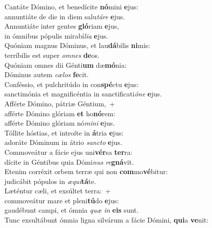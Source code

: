 \evenverse Cantáte Dómino, et benedícite \textbf{nó}mini \textbf{e}jus:~\*\\
\evenverse annuntiáte de die in diem salu\textit{tá}\textit{re} \textbf{e}jus.\\
\oddverse Annuntiáte inter gentes \textbf{gló}riam \textbf{e}jus,~\*\\
\oddverse in ómnibus pópulis mirabí\textit{li}\textit{a} \textbf{e}jus.\\
\evenverse Quóniam magnus Dóminus, et lau\textbf{dá}bilis \textbf{ni}mis:~\*\\
\evenverse terríbilis est super \textit{om}\textit{nes} \textbf{de}os.\\
\oddverse Quóniam omnes dii Génti\textbf{um} dæ\textbf{mó}nia:~\*\\
\oddverse Dóminus autem \textit{cæ}\textit{los} \textbf{fe}cit.\\
\evenverse Conféssio, et pulchritúdo in con\textbf{spé}ctu \textbf{e}jus:~\*\\
\evenverse sanctimónia et magnificéntia in sanctificati\textit{ó}\textit{ne} \textbf{e}jus.\\
\oddverse Afférte Dómino, pátriæ Géntium,~+\\
\oddverse  afférte Dómino glóriam \textbf{et} ho\textbf{nó}rem:~\*\\
\oddverse afférte Dómino glóriam nó\textit{mi}\textit{ni} \textbf{e}jus.\\
\evenverse Tóllite hóstias, et introíte in \textbf{á}tria \textbf{e}jus:~\*\\
\evenverse adoráte Dóminum in átrio \textit{san}\textit{cto} \textbf{e}jus.\\
\oddverse Commoveátur a fácie ejus uni\textbf{vér}sa \textbf{ter}ra:~\*\\
\oddverse dícite in Géntibus quia Dómi\textit{nus} \textit{re}\textbf{gná}vit.\\
\evenverse Etenim corréxit orbem terræ qui non \textbf{com}mo\textbf{vé}bitur:~\*\\
\evenverse judicábit pópulos in \textit{æ}\textit{qui}\textbf{tá}te.\\
\oddverse Læténtur cæli, et exsúltet terra:~+\\
\oddverse  commoveátur mare et pleni\textbf{tú}do \textbf{e}jus:~\*\\
\oddverse gaudébunt campi, et ómnia \textit{quæ} \textit{in} \textbf{e}\textbf{is} sunt.\\
\evenverse Tunc exsultábunt ómnia ligna silvárum a fácie Dómini, \textbf{qui}a \textbf{ve}nit:~\*\\
